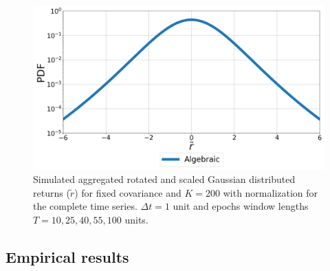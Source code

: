 \begin{figure}[htbp]
    \centering
    \includegraphics[width=0.6\columnwidth]
    {figures/06_epochs_sim_alg_ts_norm.png}
    \caption{Simulated aggregated rotated and scaled Gaussian distributed
             returns ($\tilde{r}$) for fixed covariance and $K=200$ with
             normalization for the complete time series. $\Delta t = 1$ unit
             and epochs window lengths $T=10, 25, 40, 55, 100$ units.}
    \label{fig:epochs_alg_agg_ret_pairs_norm_full_ts}
\end{figure}

\subsection{Empirical results}
\label{subsec:emp_results}